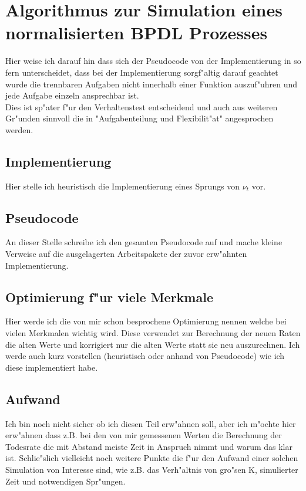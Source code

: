 \documentclass[11pt, a4paper, german]{article}
\begin{document}
\clearpage
\section{Algorithmus zur Simulation eines normalisierten BPDL Prozesses}
Hier weise ich darauf hin dass sich der Pseudocode von der Implementierung in so fern unterscheidet, dass bei der Implementierung sorgf"altig darauf geachtet wurde die trennbaren Aufgaben nicht innerhalb einer Funktion auszuf"uhren und jede Aufgabe einzeln ansprechbar ist.\\
Dies ist sp"ater f"ur den Verhaltenstest entscheidend und auch aus weiteren Gr"unden sinnvoll die in "{}Aufgabenteilung und Flexibilit"at"{} angesprochen werden.

	\subsection{Implementierung}
	Hier stelle ich heuristisch die Implementierung eines Sprungs von $ \nu_t $ vor.
	
	\subsection{Pseudocode}
	An dieser Stelle schreibe ich den gesamten Pseudocode auf und mache kleine Verweise auf die ausgelagerten Arbeitspakete der zuvor erw"ahnten Implementierung.

	\subsection{Optimierung f"ur viele Merkmale}
	Hier werde ich die von mir schon besprochene Optimierung nennen welche bei vielen Merkmalen wichtig wird. Diese verwendet zur Berechnung der neuen Raten die alten Werte und korrigiert nur die alten Werte statt sie neu auszurechnen. Ich werde auch kurz vorstellen (heuristisch oder anhand von Pseudocode) wie ich diese implementiert habe.
	
	\subsection{Aufwand}
	Ich bin noch nicht sicher ob ich diesen Teil erw"ahnen soll, aber ich m"ochte hier erw"ahnen dass z.B. bei den von mir gemessenen Werten die  Berechnung der Todesrate die mit Abstand meiste Zeit in Anspruch nimmt und warum das klar ist. Schlie"slich vielleicht noch weitere Punkte die f"ur den Aufwand einer solchen Simulation von Interesse sind, wie z.B. das Verh"altnis von gro"sen K, simulierter Zeit und notwendigen Spr"ungen.
\end{document}
